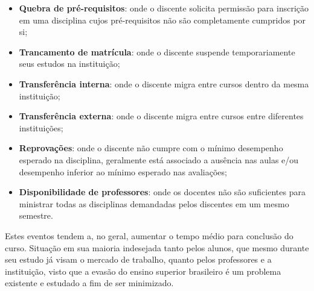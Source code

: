 \begin{itemize}
  \item \textbf{Quebra de pré-requisitos}: onde o discente solicita permissão para inscrição em uma disciplina cujos pré-requisitos não são completamente cumpridos por si;
  \item \textbf{Trancamento de matrícula}: onde o discente suspende temporariamente seus estudos na instituição;
  \item \textbf{Transferência interna}: onde o discente migra entre cursos dentro da mesma instituição;
  \item \textbf{Transferência externa}: onde o discente migra entre cursos entre diferentes instituições;
  \item \textbf{Reprovações}: onde o discente não cumpre com o mínimo desempenho esperado na disciplina, geralmente está associado a ausência nas aulas e/ou desempenho inferior ao mínimo esperado nas avaliações;
  \item \textbf{Disponibilidade de professores}: onde os docentes não são suficientes para ministrar todas as disciplinas demandadas pelos discentes em um mesmo semestre.
\end{itemize}


Estes eventos tendem a, no geral, aumentar o tempo médio para conclusão do curso. Situação em sua maioria indesejada tanto pelos alunos, que mesmo durante seu estudo já visam o mercado de trabalho, quanto pelos professores e a instituição, visto que a evasão do ensino superior brasileiro é um problema existente e estudado a fim de ser minimizado.


